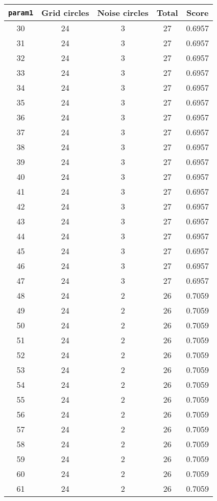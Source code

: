 \documentclass[letterpaper, 12pt]{article}
\begin{document}
\begin{longtable}{|c|c|c|c|c|}
\hline
\textbf{\texttt{param1}} & \textbf{Grid circles} & \textbf{Noise circles} & \textbf{Total} & \textbf{Score} \\
\hline
30 & 24 & 3 & 27 & 0.6957 \\
\hline
31 & 24 & 3 & 27 & 0.6957 \\
\hline
32 & 24 & 3 & 27 & 0.6957 \\
\hline
33 & 24 & 3 & 27 & 0.6957 \\
\hline
34 & 24 & 3 & 27 & 0.6957 \\
\hline
35 & 24 & 3 & 27 & 0.6957 \\
\hline
36 & 24 & 3 & 27 & 0.6957 \\
\hline
37 & 24 & 3 & 27 & 0.6957 \\
\hline
38 & 24 & 3 & 27 & 0.6957 \\
\hline
39 & 24 & 3 & 27 & 0.6957 \\
\hline
40 & 24 & 3 & 27 & 0.6957 \\
\hline
41 & 24 & 3 & 27 & 0.6957 \\
\hline
42 & 24 & 3 & 27 & 0.6957 \\
\hline
43 & 24 & 3 & 27 & 0.6957 \\
\hline
44 & 24 & 3 & 27 & 0.6957 \\
\hline
45 & 24 & 3 & 27 & 0.6957 \\
\hline
46 & 24 & 3 & 27 & 0.6957 \\
\hline
47 & 24 & 3 & 27 & 0.6957 \\
\hline
48 & 24 & 2 & 26 & 0.7059 \\
\hline
49 & 24 & 2 & 26 & 0.7059 \\
\hline
50 & 24 & 2 & 26 & 0.7059 \\
\hline
51 & 24 & 2 & 26 & 0.7059 \\
\hline
52 & 24 & 2 & 26 & 0.7059 \\
\hline
53 & 24 & 2 & 26 & 0.7059 \\
\hline
54 & 24 & 2 & 26 & 0.7059 \\
\hline
55 & 24 & 2 & 26 & 0.7059 \\
\hline
56 & 24 & 2 & 26 & 0.7059 \\
\hline
57 & 24 & 2 & 26 & 0.7059 \\
\hline
58 & 24 & 2 & 26 & 0.7059 \\
\hline
59 & 24 & 2 & 26 & 0.7059 \\
\hline
60 & 24 & 2 & 26 & 0.7059 \\
\hline
61 & 24 & 2 & 26 & 0.7059 \\

\end{longtable}
\end{document}
